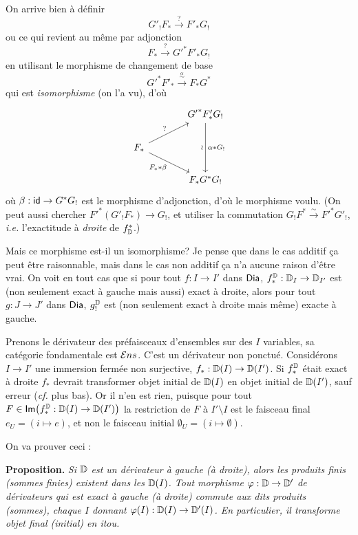 
On arrive bien à définir
\[
G'_!F_* \xrightarrow{?} F'_*G_!
\]
ou ce qui revient au même par adjonction
\[
F_* \xrightarrow{?} {G'}^*F'_*G_!
\]
en utilisant le morphisme de changement de base
\[
{G'}^*F'_* \xrightarrow{\overset{\alpha}{\sim}} F_*G^*
\]
qui est \textit{isomorphisme} (on l'a vu), d'où
\[
\begin{tikzcd}[column sep=large, row sep=normal]
& {G'}^*F'_*G_! \arrow[dd, "\wr"', "\alpha * G_!"] \\
F_* \arrow[ur, "?"] \arrow[dr, "F_* * \beta"'] & \\
& F_*G^*G_!
\end{tikzcd}
\]
où $\beta : \mathsf{id} \to G^*G_!$ est le morphisme d'adjonction, d'où le morphisme voulu. (On peut aussi chercher ${F'}^*(G'_!F_*) \to G_!$, et utiliser la commutation $G_!F^* \overset{\sim}{\to} {F'}^*G'_!$, \textit{i.e.} l'exactitude à \textit{droite} de $f^*_{\mathbb{D}}$.)


Mais ce morphisme est-il un isomorphisme? Je pense que dans le cas additif ça peut être raisonnable, mais dans le cas non additif ça n'a aucune raison d'être vrai. On voit en tout cas que si pour tout $f : I \to I'$ dans $\mathsf{Dia}$, $f^{\mathbb{D}}_* : \mathbb{D}_I \to \mathbb{D}_{I'}$ est (non seulement exact à gauche mais aussi) exact à droite, alors pour tout $g : J \to J'$ dans $\mathsf{Dia}$, $g^{\mathbb{D}}_!$ est (non seulement exact à droite mais même) exacte à gauche. %

Prenons le dérivateur des préfaisceaux d'ensembles sur des $I$ variables, sa catégorie fondamentale est $\mathcal{E}ns$. C'est un dérivateur non ponctué. Considérons $I \to I'$ une immersion fermée non surjective, $f_* : \mathbb{D}(I) \to \mathbb{D}(I')$. Si $f^{\mathbb{D}}_*$ était exact à droite $f_*$ devrait transformer objet initial de $\mathbb{D}(I)$ en objet initial de $\mathbb{D}(I')$, sauf erreur (\textit{cf.} plus bas). Or il n'en est rien, puisque pour tout $F \in \mathsf{Im}\bigl(f^{\mathbb{D}}_* : \mathbb{D}(I) \to \mathbb{D}(I')\bigr)$ la restriction de $F$ à $I' \setminus I$ est le faisceau final $e_U = (i \mapsto e)$, et non le faisceau initial $\emptyset_U = (i \mapsto \emptyset)$.

On va prouver ceci :

\textbf{Proposition.} \textit{Si $\mathbb{D}$ est un dérivateur à gauche (à droite), alors les produits finis (sommes finies) existent dans les $\mathbb{D}(I)$. Tout morphisme $\varphi : \mathbb{D} \to \mathbb{D}'$ de dérivateurs qui est exact à gauche (à droite) commute aux dits produits (sommes), chaque $I$ donnant $\varphi(I) : \mathbb{D}(I) \to \mathbb{D}'(I)$. En particulier, il transforme objet final (initial) en itou.}

